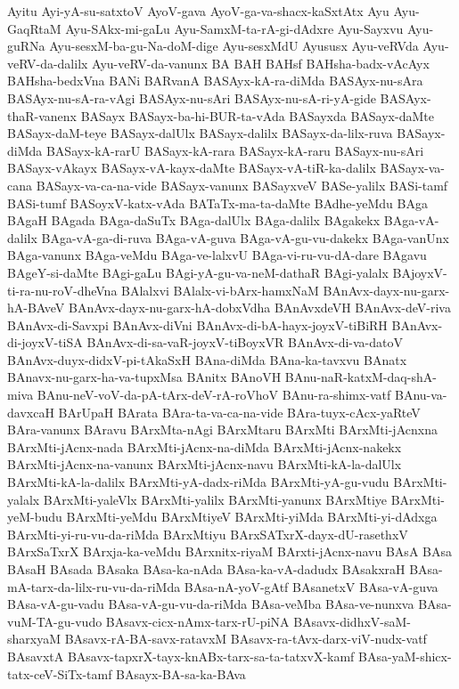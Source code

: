 {Ayitu
Ayi-yA-su-satxtoV
AyoV-gava
AyoV-ga-va-shacx-kaSxtAtx
Ayu
Ayu-GaqRtaM
Ayu-SAkx-mi-gaLu
Ayu-SamxM-ta-rA-gi-dAdxre
Ayu-Sayxvu
Ayu-guRNa
Ayu-sesxM-ba-gu-Na-doM-dige
Ayu-sesxMdU
Ayususx
Ayu-veRVda
Ayu-veRV-da-dalilx
Ayu-veRV-da-vanunx
BA
BAH
BAHsf
BAHsha-badx-vAcAyx
BAHsha-bedxVna
BANi
BARvanA
BASAyx-kA-ra-diMda
BASAyx-nu-sAra
BASAyx-nu-sA-ra-vAgi
BASAyx-nu-sAri
BASAyx-nu-sA-ri-yA-gide
BASAyx-thaR-vanenx
BASayx
BASayx-ba-hi-BUR-ta-vAda
BASayxda
BASayx-daMte
BASayx-daM-teye
BASayx-dalUlx
BASayx-dalilx
BASayx-da-lilx-ruva
BASayx-diMda
BASayx-kA-rarU
BASayx-kA-rara
BASayx-kA-raru
BASayx-nu-sAri
BASayx-vAkayx
BASayx-vA-kayx-daMte
BASayx-vA-tiR-ka-dalilx
BASayx-va-cana
BASayx-va-ca-na-vide
BASayx-vanunx
BASayxveV
BASe-yalilx
BASi-tamf
BASi-tumf
BASoyxV-katx-vAda
BATaTx-ma-ta-daMte
BAdhe-yeMdu
BAga
BAgaH
BAgada
BAga-daSuTx
BAga-dalUlx
BAga-dalilx
BAgakekx
BAga-vA-dalilx
BAga-vA-ga-di-ruva
BAga-vA-guva
BAga-vA-gu-vu-dakekx
BAga-vanUnx
BAga-vanunx
BAga-veMdu
BAga-ve-lalxvU
BAga-vi-ru-vu-dA-dare
BAgavu
BAgeY-si-daMte
BAgi-gaLu
BAgi-yA-gu-va-neM-dathaR
BAgi-yalalx
BAjoyxV-ti-ra-nu-roV-dheVna
BAlalxvi
BAlalx-vi-bArx-hamxNaM
BAnAvx-dayx-nu-garx-hA-BAveV
BAnAvx-dayx-nu-garx-hA-dobxVdha
BAnAvxdeVH
BAnAvx-deV-riva
BAnAvx-di-Savxpi
BAnAvx-diVni
BAnAvx-di-bA-hayx-joyxV-tiBiRH
BAnAvx-di-joyxV-tiSA
BAnAvx-di-sa-vaR-joyxV-tiBoyxVR
BAnAvx-di-va-datoV
BAnAvx-duyx-didxV-pi-tAkaSxH
BAna-diMda
BAna-ka-tavxvu
BAnatx
BAnavx-nu-garx-ha-va-tupxMsa
BAnitx
BAnoVH
BAnu-naR-katxM-daq-shA-miva
BAnu-neV-voV-da-pA-tArx-deV-rA-roVhoV
BAnu-ra-shimx-vatf
BAnu-va-davxcaH
BArUpaH
BArata
BAra-ta-va-ca-na-vide
BAra-tuyx-cAcx-yaRteV
BAra-vanunx
BAravu
BArxMta-nAgi
BArxMtaru
BArxMti
BArxMti-jAcnxna
BArxMti-jAcnx-nada
BArxMti-jAcnx-na-diMda
BArxMti-jAcnx-nakekx
BArxMti-jAcnx-na-vanunx
BArxMti-jAcnx-navu
BArxMti-kA-la-dalUlx
BArxMti-kA-la-dalilx
BArxMti-yA-dadx-riMda
BArxMti-yA-gu-vudu
BArxMti-yalalx
BArxMti-yaleVlx
BArxMti-yalilx
BArxMti-yanunx
BArxMtiye
BArxMti-yeM-budu
BArxMti-yeMdu
BArxMtiyeV
BArxMti-yiMda
BArxMti-yi-dAdxga
BArxMti-yi-ru-vu-da-riMda
BArxMtiyu
BArxSATxrX-dayx-dU-rasethxV
BArxSaTxrX
BArxja-ka-veMdu
BArxnitx-riyaM
BArxti-jAcnx-navu
BAsA
BAsa
BAsaH
BAsada
BAsaka
BAsa-ka-nAda
BAsa-ka-vA-dadudx
BAsakxraH
BAsa-mA-tarx-da-lilx-ru-vu-da-riMda
BAsa-nA-yoV-gAtf
BAsanetxV
BAsa-vA-guva
BAsa-vA-gu-vadu
BAsa-vA-gu-vu-da-riMda
BAsa-veMba
BAsa-ve-nunxva
BAsa-vuM-TA-gu-vudo
BAsavx-cicx-nAmx-tarx-rU-piNA
BAsavx-didhxV-saM-sharxyaM
BAsavx-rA-BA-savx-ratavxM
BAsavx-ra-tAvx-darx-viV-nudx-vatf
BAsavxtA
BAsavx-tapxrX-tayx-knABx-tarx-sa-ta-tatxvX-kamf
BAsa-yaM-shicx-tatx-ceV-SiTx-tamf
BAsayx-BA-sa-ka-BAva
}
